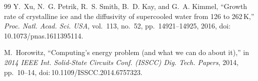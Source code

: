 \documentclass[11pt]{article}
\theoremstyle{definition}
\begin{document}
\begin{thebibliography}{99}
Y.~Xu, N.~G. Petrik, R.~S. Smith, B.~D. Kay, and G.~A. Kimmel, ``Growth rate of crystalline
ice and the diffusivity of supercooled water from 126 to 262\,K,'' \emph{Proc. Natl. Acad.
Sci. USA}, vol.~113, no.~52, pp.~14921--14925, 2016, doi:\,10.1073/pnas.1611395114.

M.~Horowitz, ``Computing's energy problem (and what we can do about it),'' in \emph{2014
IEEE Int. Solid-State Circuits Conf. (ISSCC) Dig. Tech. Papers}, 2014, pp.~10--14,
doi:\,10.1109/ISSCC.2014.6757323.

\end{thebibliography}
\end{document}
